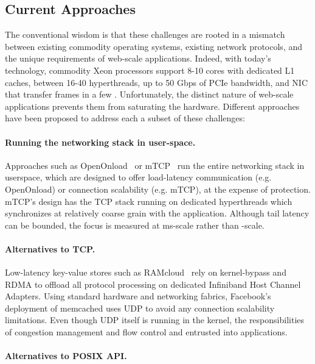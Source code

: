 \subsection{Current Approaches}
\label{sec:motivation:current}

The conventional wisdom is that these challenges are rooted in a
mismatch between existing commodity operating systems, existing
network protocols, and the unique requirements of web-scale
applications.  Indeed, with today's technology, commodity Xeon
processors support 8-10 cores with dedicated L1 caches, between 16-40
hyperthreads, up to 50 Gbps of PCIe bandwidth, and NIC that transfer
frames in a few \microsecond.  Unfortunately, the distinct nature of
web-scale applications prevents them from saturating the hardware.
Different approaches have been proposed to address each a subset of
these challenges:

\paragraph{Running the networking stack in user-space.}  

Approaches such as OpenOnload~\cite{openonload} or
mTCP~\cite{jeong2014mtcp} run the entire networking stack in
userspace, which are designed to offer load-latency communication
(e.g. OpenOnload) or connection scalability (e.g. mTCP), at the
expense of protection.  mTCP's design has the TCP stack running on
dedicated hyperthreads which synchronizes at relatively coarse grain
with the application. Although tail latency can be bounded, the focus
is measured at ms-scale rather than \microsecond-scale.

\paragraph{Alternatives to TCP.}

Low-latency key-value stores such as
RAMcloud~\cite{DBLP:conf/sosp/OngaroRSOR11} rely on kernel-bypass and
RDMA to offload all protocol processing on dedicated Infiniband Host Channel
Adapters.  Using standard hardware and networking fabrics, Facebook's
deployment of memcached uses UDP to avoid any connection scalability
limitations.  Even though UDP itself is running in the kernel, the
responsibilities of congestion management and flow control and
entrusted into applications.

\paragraph{Alternatives to POSIX API.}

